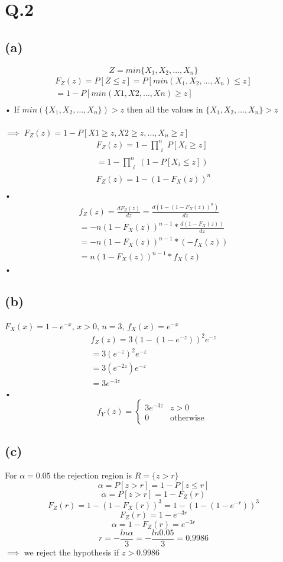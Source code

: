 \documentclass[a4paper,11pt]{article}
\begin{document}
\newpage
\clearpage
\section*{Q.2}
\subsection*{(a)}

$$Z = min\{X_1,X_2,\dots ,X_n\}$$
\begin{eqnarray*}
F_Z(z)=P[Z\leq z]=P[min(X_1,X_2,\dots ,X_n)\leq z]\\
=1-P[min(X1,X2,\dots ,Xn)\geq z]\\
\end{eqnarray*}•
If $min(\{X_1,X_2,\dots, X_n\}) > z$ then all the values in $\{X_1,X_2,\dots, X_n\} > z$\\\\
$\implies$ $F_Z(z) = 1 - P [X1 \geq z, X2\geq z, \dots , X_n \geq z]$
\begin{eqnarray*}
F_Z(z) = 1 - \prod_{\substack{i}}^{n}P[X_i\geq z]\\
= 1 - \prod_{\substack{i}}^{n}(1-P[X_i\leq z])\\
F_Z(z) = 1 - (1-F_X(z))^n\\
\end{eqnarray*}•
\begin{eqnarray*}
f_Z(z) = \frac{dF_Z(z)}{dz}=\frac{d(1-(1-F_X(z))^n)}{dz}\\
= -n(1-F_X(z))^{n-1}*\frac{d(1-F_X(z))}{dz}\\
= -n(1-F_X(z))^{n-1}*(-f_X(z))\\
=  n(1-F_X(z))^{n-1}*f_X(z)
\end{eqnarray*}•

\subsection*{(b)}
$F_X(x) = 1-e^{-x}$, $x>0$, $n=3$, $f_X(x) = e^{-x}$
\begin{eqnarray*}
f_Z(z) = 3(1-(1-e^{-z}))^2e^{-z}\\
= 3(e^{-z})^2e^{-z}\\
= 3(e^{-2z})e^{-z}\\
= 3e^{-3z}
\end{eqnarray*}•
\[
 f_Y(z)=
  \begin{cases} 
   3e^{-3z}& z>0\\
   0       & \text{otherwise }
  \end{cases}
\]
\newpage
\clearpage
\subsection*{(c)}
For $\alpha=0.05$ the rejection region is $R = \{z>r\}$\\
$$\alpha = P[z>r]=1-P[z\leq r]$$
$$\alpha = P[z>r]=1-F_Z(r)$$
$$F_Z(r) = 1-(1-F_X(r))^3=1-(1-(1-e^{-r}))^3$$
$$F_Z(r) =1-e^{-3r}$$
$$\alpha = 1- F_Z(r)=e^{-3r}$$
$$r =-\frac{ln\alpha}{3}=-\frac{ln 0.05}{3}=0.9986$$
$\implies$ we reject the hypothesis if $z>0.9986$
\end{document}
